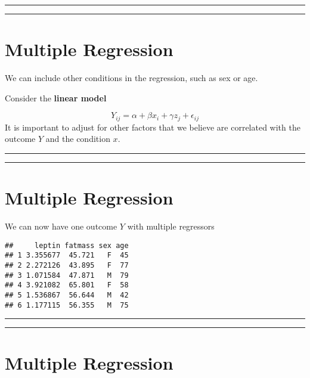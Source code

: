 \documentclass[
]{book}
\begin{document}
\begin{center}\rule{0.5\linewidth}{0.5pt}\end{center}

\begin{center}\rule{0.5\linewidth}{0.5pt}\end{center}

\hypertarget{multiple-regression}{%
\section{Multiple Regression}\label{multiple-regression}}

We can include other conditions in the regression, such as sex or age.

Consider the \textbf{linear model}

\[Y_{ij} = \alpha + \beta x_i +\gamma z_j+\epsilon_{ij}\]
It is important to adjust for other factors that we believe are correlated with the outcome \(Y\) and the condition \(x\).

\begin{center}\rule{0.5\linewidth}{0.5pt}\end{center}

\begin{center}\rule{0.5\linewidth}{0.5pt}\end{center}

\hypertarget{multiple-regression-1}{%
\section{Multiple Regression}\label{multiple-regression-1}}

We can now have one outcome \(Y\) with multiple regressors

\begin{verbatim}
##     leptin fatmass sex age
## 1 3.355677  45.721   F  45
## 2 2.272126  43.895   F  77
## 3 1.071584  47.871   M  79
## 4 3.921082  65.801   F  58
## 5 1.536867  56.644   M  42
## 6 1.177115  56.355   M  75
\end{verbatim}

\begin{center}\rule{0.5\linewidth}{0.5pt}\end{center}

\begin{center}\rule{0.5\linewidth}{0.5pt}\end{center}

\hypertarget{multiple-regression-2}{%
\section{Multiple Regression}\label{multiple-regression-2}}
\end{document}
